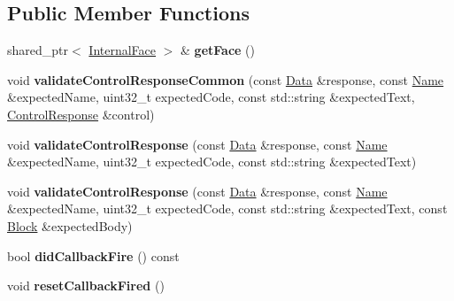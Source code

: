 \subsection*{Public Member Functions}
\begin{DoxyCompactItemize}
\item 
shared\+\_\+ptr$<$ \hyperlink{classnfd_1_1InternalFace}{Internal\+Face} $>$ \& {\bfseries get\+Face} ()\hypertarget{classnfd_1_1tests_1_1TestFaceManagerCommon_a4ec51b6387333b85336667b9bfde1c03}{}\label{classnfd_1_1tests_1_1TestFaceManagerCommon_a4ec51b6387333b85336667b9bfde1c03}

\item 
void {\bfseries validate\+Control\+Response\+Common} (const \hyperlink{classndn_1_1Data}{Data} \&response, const \hyperlink{classndn_1_1Name}{Name} \&expected\+Name, uint32\+\_\+t expected\+Code, const std\+::string \&expected\+Text, \hyperlink{classndn_1_1mgmt_1_1ControlResponse}{Control\+Response} \&control)\hypertarget{classnfd_1_1tests_1_1TestFaceManagerCommon_a193df26d6617aca33495c9cb3b07f3c7}{}\label{classnfd_1_1tests_1_1TestFaceManagerCommon_a193df26d6617aca33495c9cb3b07f3c7}

\item 
void {\bfseries validate\+Control\+Response} (const \hyperlink{classndn_1_1Data}{Data} \&response, const \hyperlink{classndn_1_1Name}{Name} \&expected\+Name, uint32\+\_\+t expected\+Code, const std\+::string \&expected\+Text)\hypertarget{classnfd_1_1tests_1_1TestFaceManagerCommon_af1c34bc4477e54951acb44c0e83518c1}{}\label{classnfd_1_1tests_1_1TestFaceManagerCommon_af1c34bc4477e54951acb44c0e83518c1}

\item 
void {\bfseries validate\+Control\+Response} (const \hyperlink{classndn_1_1Data}{Data} \&response, const \hyperlink{classndn_1_1Name}{Name} \&expected\+Name, uint32\+\_\+t expected\+Code, const std\+::string \&expected\+Text, const \hyperlink{classndn_1_1Block}{Block} \&expected\+Body)\hypertarget{classnfd_1_1tests_1_1TestFaceManagerCommon_a6bd88ce83307fb6324d2ca119535d785}{}\label{classnfd_1_1tests_1_1TestFaceManagerCommon_a6bd88ce83307fb6324d2ca119535d785}

\item 
bool {\bfseries did\+Callback\+Fire} () const\hypertarget{classnfd_1_1tests_1_1TestFaceManagerCommon_afa99dda3e68e8282e2d4e72a8bd01328}{}\label{classnfd_1_1tests_1_1TestFaceManagerCommon_afa99dda3e68e8282e2d4e72a8bd01328}

\item 
void {\bfseries reset\+Callback\+Fired} ()\hypertarget{classnfd_1_1tests_1_1TestFaceManagerCommon_a1cf9b79063b3b929469b5c9298fdd85f}{}\label{classnfd_1_1tests_1_1TestFaceManagerCommon_a1cf9b79063b3b929469b5c9298fdd85f}

\end{DoxyCompactItemize}
